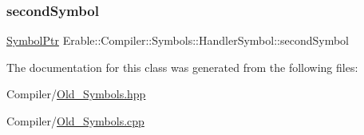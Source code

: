 \subsubsection{\texorpdfstring{secondSymbol}{secondSymbol}}
{\footnotesize\ttfamily \mbox{\hyperlink{namespace_erable_1_1_compiler_1_1_symbols_a8f0bc762f448ea4d84e8713ab3e140b9}{Symbol\+Ptr}} Erable\+::\+Compiler\+::\+Symbols\+::\+Handler\+Symbol\+::second\+Symbol}



The documentation for this class was generated from the following files\+:\begin{DoxyCompactItemize}
\item 
Compiler/\mbox{\hyperlink{_old___symbols_8hpp}{Old\+\_\+\+Symbols.\+hpp}}\item 
Compiler/\mbox{\hyperlink{_old___symbols_8cpp}{Old\+\_\+\+Symbols.\+cpp}}\end{DoxyCompactItemize}
